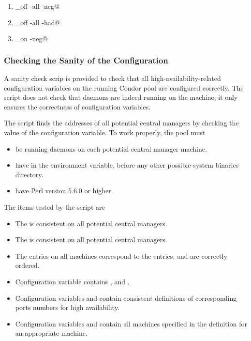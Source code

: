 \begin{enumerate}
\item \verb@condor_off -all -neg@
\item \verb@condor_off -all -had@
\item \verb@condor_on -neg@
\end{enumerate}

\subsubsection{\label{sec:HA-check-script} Checking the Sanity of the
Configuration} 

A sanity check scrip is provided to check
that all high-availability-related configuration
variables on the running Condor pool are configured correctly. 
The script does not check that daemons are indeed
running on the machine;
it only ensures the correctness of configuration variables.

The script finds the addresses of all potential central managers
by checking the value of the 
 configuration variable.
To work properly, the pool must

\begin{itemize}
\item be running  daemons on each potential
central manager machine.
\item have  in the  environment variable,
before any other possible system binaries directory.
\item have Perl version 5.6.0 or higher.
\end{itemize}

The items tested by the script are

\begin{itemize}
\item The  is consistent on all potential central managers. 
\item The  is consistent 
on all potential central managers.
\item The  entries on all machines
correspond to the  entries,
and are correctly ordered.
\item Configuration variable  contains ,  and .
\item Configuration variables  and 
contain consistent definitions of corresponding ports numbers for 
high availability.
\item Configuration variables  and
 contain all machines
specified in the  definition
for an appropriate machine. 
\end{itemize}

